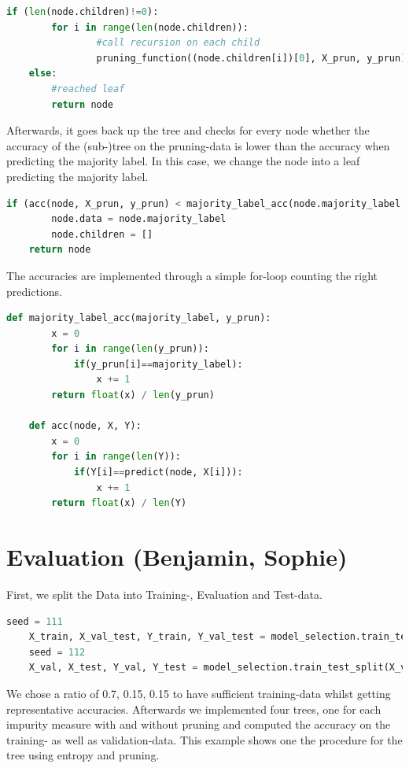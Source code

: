 \documentclass[12pt,a4paper]{scrartcl}		%
\begin{document}
\begin{lstlisting}[language=Python]
    if (len(node.children)!=0):  
        for i in range(len(node.children)):
                #call recursion on each child
                pruning_function((node.children[i])[0], X_prun, y_prun) 
    else:
        #reached leaf
        return node
\end{lstlisting}

Afterwards, it goes back up the tree and checks for every node whether the accuracy of the (sub-)tree on the 
pruning-data is lower than the accuracy when predicting the majority label. 
In this case, we change the node into a leaf predicting the majority label. 

\begin{lstlisting}[language=Python]
    if (acc(node, X_prun, y_prun) < majority_label_acc(node.majority_label, y_prun)):
        node.data = node.majority_label
        node.children = []
    return node
\end{lstlisting}

The accuracies are implemented through a simple for-loop counting the right predictions. 

\begin{lstlisting}[language=Python]
    def majority_label_acc(majority_label, y_prun):
        x = 0
        for i in range(len(y_prun)):
            if(y_prun[i]==majority_label):
                x += 1
        return float(x) / len(y_prun)

    def acc(node, X, Y):
        x = 0
        for i in range(len(Y)):
            if(Y[i]==predict(node, X[i])):
                x += 1
        return float(x) / len(Y)
\end{lstlisting}

\section{Evaluation (Benjamin, Sophie)}
First, we split the Data into Training-, Evaluation and Test-data. 

\begin{lstlisting}[language=Python]
    seed = 111
    X_train, X_val_test, Y_train, Y_val_test = model_selection.train_test_split(X, y, test_size= 0.3, shuffle=True, random_state = seed)
    seed = 112
    X_val, X_test, Y_val, Y_test = model_selection.train_test_split(X_val_test, Y_val_test, test_size= 0.5, shuffle=True, random_state = seed)
\end{lstlisting}

We chose a ratio of 0.7, 0.15, 0.15 to have sufficient training-data whilst getting representative accuracies. 
Afterwards we implemented four trees, one for each impurity measure with and without pruning and computed the 
accuracy on the training- as well as validation-data. This example shows one the procedure for the tree using 
entropy and pruning. 
\end{document}
